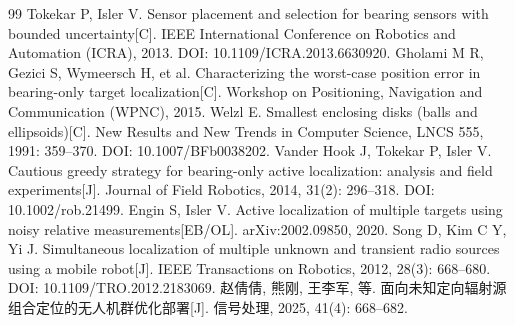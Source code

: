 \documentclass[UTF8,a4paper,zihao=-4,fontset=none]{ctexart}
\begin{document}
\clearpage
\begin{thebibliography}{99}
   Tokekar P, Isler V. Sensor placement and selection for bearing sensors with bounded uncertainty[C]. IEEE International Conference on Robotics and Automation (ICRA), 2013. DOI: 10.1109/ICRA.2013.6630920.
   Gholami M R, Gezici S, Wymeersch H, et al. Characterizing the worst-case position error in bearing-only target localization[C]. Workshop on Positioning, Navigation and Communication (WPNC), 2015.
   Welzl E. Smallest enclosing disks (balls and ellipsoids)[C]. New Results and New Trends in Computer Science, LNCS 555, 1991: 359--370. DOI: 10.1007/BFb0038202.
   Vander Hook J, Tokekar P, Isler V. Cautious greedy strategy for bearing-only active localization: analysis and field experiments[J]. Journal of Field Robotics, 2014, 31(2): 296--318. DOI: 10.1002/rob.21499.
   Engin S, Isler V. Active localization of multiple targets using noisy relative measurements[EB/OL]. arXiv:2002.09850, 2020.
   Song D, Kim C Y, Yi J. Simultaneous localization of multiple unknown and transient radio sources using a mobile robot[J]. IEEE Transactions on Robotics, 2012, 28(3): 668--680. DOI: 10.1109/TRO.2012.2183069.
   赵倩倩, 熊刚, 王李军, 等. 面向未知定向辐射源组合定位的无人机群优化部署[J]. 信号处理, 2025, 41(4): 668--682.
\end{thebibliography}
\end{document}
